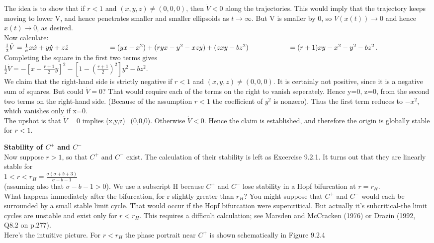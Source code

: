 \documentclass{article}
\newcommand\tab[1][1cm]{\hspace*{#1}}
\begin{document}
The idea is to show that if $r<1$ and $(x,y,z)\neq (0,0,0)$, then $\dot{V}<0$ along the trajectories. This would imply that the trajectory keeps moving to lower V, and hence penetrates smaller and smaller ellipsoids as $t \to \infty$. But V is smaller by 0, so $V(x(t)) \to 0$ and hence $x(t) \to 0$, as desired. \\ \tab
Now calculate: \\ \tab \tab
$\frac{1}{2}\dot{V}=\frac{1}{\sigma}{x}\dot{x}+y \dot{y}+z \dot{z} \\ \tab \tab
=(yx-x^{2})+(ryx-y^{2}-xzy)+(zxy-bz^{2}) \\
\tab \tab
=(r+1)xy-x^{2}-y^{2}-bz^{2}$. \\
Completing the square in the first two terms gives \\ \tab \tab
$\frac{1}{2}\dot{V}=-[x-\frac{r+1}{2}y]^{2}-[1-(\frac{r+1}{2})^{2}]y^{2}-bz^{2}$. \\
We claim that the right-hand side is strictly negative if $r<1$ and $(x,y,z)\neq (0,0,0)$. It is certainly not positive, since it is a negative sum of squares. But could $\dot{V}=0$? That would require each of the terms on the right to vanish seperately. Hence y=0, z=0, from the second two terms on the right-hand side. (Because of the assumption $r<1$ the coefficient of $y^{2}$ is nonzero). Thus the first term reduces to $-x^{2}$, which vanishes only if x=0. \\ \tab 
The upshot is that $\dot{V}=0$ implies (x,y,z)=(0,0,0). Otherwise $\dot{V}<0$. Hence the claim is established, and therefore the origin is globally stable for $r<1$. 

\textbf {Stability of $C^{+}$ and $C^{-}$} \\ \tab
Now suppose $r>1$, so that $C^{+}$ and $C^{-}$ exist. The calculation of their stability is left as Excercise 9.2.1. It turns out that they are linearly stable for \\ \tab \tab
$1<r<r_{H}=\frac{\sigma (\sigma + b + 3)}{\sigma - b -1}$ \\
(assuming also that $\sigma - b - 1 >0$). We use a subscript H because $C^{+}$ and $C^{-}$ lose stability in a Hopf bifurcation at $r=r_{H}$. \\ \tab
What happens immediately after the bifurcation, for r slightly greater than $r_{H}$? You might suppose that $C^{+}$ and $C^{-}$ would each be surrounded by a small stable limit cycle. That would occur if the Hopf bifurcation were supercritical. But actually it's subcritical-the limit cycles are unstable and exist only for $r<r_{H}$. This requires a difficult calculation; see Marsden and McCracken (1976) or Drazin (1992, Q8.2 on p.277). \\ \tab
Here's the intuitive picture. For $r<r_{H}$ the phase portrait near $C^{+}$ is shown schematically in Figure 9.2.4 \\ 
\end{document}
